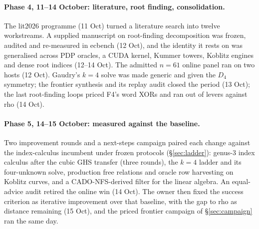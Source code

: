 \paragraph{Phase 4, 11--14 October: literature, root finding,
consolidation.} The lit2026 programme (11 Oct) turned a literature search
into twelve workstreams. A supplied manuscript on root-finding
decomposition was frozen, audited and re-measured in ecbench (12 Oct), and
the identity it rests on was generalised across PDP oracles, a CUDA
kernel, Kummer towers, Koblitz engines and dense root indices (12--14
Oct). The admitted $n=61$ online panel ran on two hosts (12 Oct). Gaudry's
$k=4$ solve was made generic and given the $D_4$ symmetry; the frontier
synthesis and its replay audit closed the period (13 Oct); the last
root-finding loops priced F4's word XORs and ran out of levers against rho
(14 Oct).

\paragraph{Phase 5, 14--15 October: measured against the baseline.} Two
improvement rounds and a next-steps campaign paired each change against
the index-calculus incumbent under frozen protocols
(\S\ref{sec:ladder}): genus-3 index calculus after the cubic GHS transfer (three rounds),
the $k=4$ ladder and its four-unknown solve, production free relations and
oracle row harvesting on Koblitz curves, and a CADO-NFS-derived filter for
the linear algebra. An equal-advice audit retired the online win (14 Oct).
The owner then fixed the success criterion as iterative improvement over
that baseline, with the gap to rho as distance remaining (15 Oct), and the
priced frontier campaign of \S\ref{sec:campaign} ran the same day.
